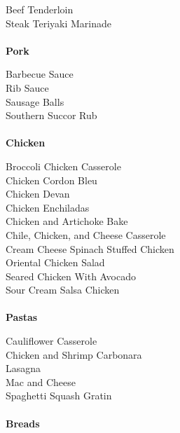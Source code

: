 \documentclass[11pt, twoside, openany]{book}
\begin{document}
Beef Tenderloin\hrulefill\pageref{beef-tenderloin}\\
Steak Teriyaki Marinade\hrulefill\pageref{steak-teriyaki-marinade}\\
{~\vspace{2mm}\\ \Large \textbf{Pork}}\hfill\textbf{\pageref{pork}}

Barbecue Sauce\hrulefill\pageref{barbecue-sauce}\\
Rib Sauce\hrulefill\pageref{rib-sauce}\\
Sausage Balls\hrulefill\pageref{sausage-balls}\\
Southern Succor Rub\hrulefill\pageref{southern-succor-rub}\\
{~\vspace{2mm}\\ \Large \textbf{Chicken}}\hfill\textbf{\pageref{chicken}}

Broccoli Chicken Casserole\hrulefill\pageref{broccoli-chicken-casserole}\\
Chicken Cordon Bleu\hrulefill\pageref{chicken-cordon-bleu}\\
Chicken Devan\hrulefill\pageref{chicken-devan}\\
Chicken Enchiladas\hrulefill\pageref{chicken-enchiladas}\\
Chicken and Artichoke Bake\hrulefill\pageref{chicken-and-artichoke-bake}\\
Chile, Chicken, and Cheese Casserole\hrulefill\pageref{chile,-chicken,-and-cheese-casserole}\\
Cream Cheese Spinach Stuffed Chicken\hrulefill\pageref{cream-cheese-spinach-stuffed-chicken}\\
Oriental Chicken Salad\hrulefill\pageref{oriental-chicken-salad}\\
Seared Chicken With Avocado\hrulefill\pageref{seared-chicken-with-avocado}\\
Sour Cream Salsa Chicken\hrulefill\pageref{sour-cream-salsa-chicken}\\
{~\vspace{2mm}\\ \Large \textbf{Pastas}}\hfill\textbf{\pageref{pastas}}

Cauliflower Casserole\hrulefill\pageref{cauliflower-casserole}\\
Chicken and Shrimp Carbonara\hrulefill\pageref{chicken-and-shrimp-carbonara}\\
Lasagna\hrulefill\pageref{lasagna}\\
Mac and Cheese\hrulefill\pageref{mac-and-cheese}\\
Spaghetti Squash Gratin\hrulefill\pageref{spaghetti-squash-gratin}\\
{~\vspace{2mm}\\ \Large \textbf{Breads}}\hfill\textbf{\pageref{breads}}
\end{document}
